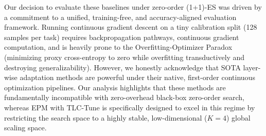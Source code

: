 Our decision to evaluate these baselines under zero-order (1+1)-ES was driven by a commitment to a unified, training-free, and accuracy-aligned evaluation framework. Running continuous gradient descent on a tiny calibration split (128 samples per task) requires backpropagation pathways, continuous gradient computation, and is heavily prone to the Overfitting-Optimizer Paradox (minimizing proxy cross-entropy to zero while overfitting transductively and destroying generalizability). However, we honestly acknowledge that SOTA layer-wise adaptation methods are powerful under their native, first-order continuous optimization pipelines. Our analysis highlights that these methods are fundamentally incompatible with zero-overhead black-box zero-order search, whereas EPM with TLC-Tune is specifically designed to excel in this regime by restricting the search space to a highly stable, low-dimensional ($K=4$) global scaling space.

